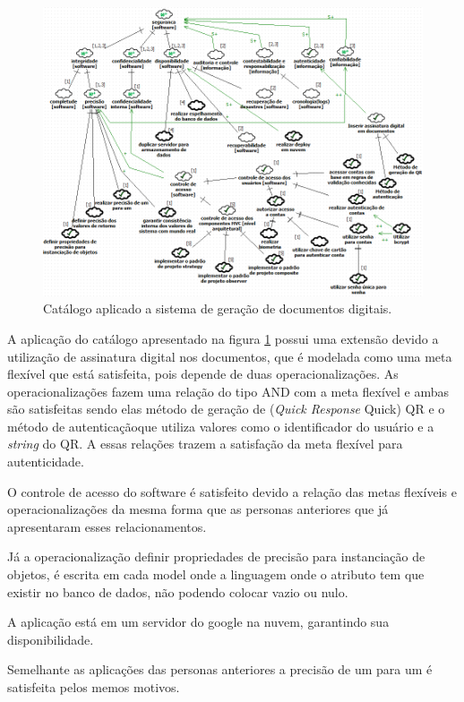 \begin{figure}[h!]
	\centering
	\includegraphics[keepaspectratio=true,scale=0.7]{figuras/catalogoPersona4.PNG}
	\caption{Catálogo aplicado a sistema de geração de documentos digitais.}
	\label{catalogoPersona4}
\end{figure}

A aplicação do catálogo apresentado na figura \ref{catalogoPersona4} possui uma extensão devido a utilização de assinatura digital nos documentos, que é modelada como uma meta flexível que está satisfeita, pois depende de duas operacionalizações. As operacionalizações fazem uma relação do tipo AND com a meta flexível e ambas são satisfeitas sendo elas método de geração de (\textit{Quick Response} Quick) QR e o  método de autenticaçãoque utiliza valores como o identificador do usuário e a \textit{string} do QR. A essas relações trazem a satisfação da meta flexível para autenticidade. 

O controle de acesso do software é satisfeito devido a relação das metas flexíveis e operacionalizações da mesma forma que as personas anteriores que já apresentaram esses relacionamentos.  

Já a operacionalização definir propriedades de precisão para instanciação de objetos, é escrita em cada model onde a linguagem onde o atributo tem que existir no banco de dados, não podendo colocar vazio ou nulo. 

A aplicação está em um servidor do google na nuvem, garantindo sua disponibilidade.  

Semelhante as aplicações das personas anteriores a precisão de um para um é satisfeita pelos memos motivos.

